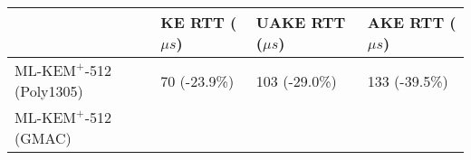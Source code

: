 \documentclass[journal=tches,submission]{iacrtrans}
\newcommand{\us}{\mu s}
\def\mlkemplus{\text{ML-KEM}^+}
\begin{document}
\begin{table}[h]
    \centering
    \small

    \begin{tabular}{|p{2.5cm}|p{1.4cm}|p{1.8cm}|p{1.8cm}|}
       \hline
       & KE RTT \newline ($\us$) 
       & UAKE RTT \newline ($\us$) 
       & AKE RTT \newline ($\us$) \\
       \hline
       $\mlkemplus$-512 \newline (Poly1305)
       & 70 \newline (-23.9\%)
       & 103 \newline (-29.0\%)
       & 133 \newline (-39.5\%) \\
       \hline
       $\mlkemplus$-512 \newline (GMAC)

\end{tabular}
\end{table}
\end{document}
